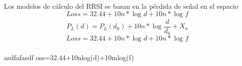 \documentclass[a4paper ,12pt, onecolumn]{article}
\begin{document}
\paragraph{}
Los modelos de cálculo del RRSI se basan en la pérdida de señal en el espacio
\begin{equation}
    Loss = 32.44 + 10n*\log_{} d+ 10n*\log_{} f
\end{equation}
\begin{equation}
    P_L(d) = P_L(d_0) + 10n*\log_{} \frac{ d }{d_0 }   + X_\sigma
\end{equation}
\begin{equation}
    Loss = 32.44 + 10n*\log_{} d+ 10n*\log_{} f
\end{equation}
\paragraph{}
asdfafasdf oss=32.44+10nlog(d)+10mlog(f)
\end{document}
